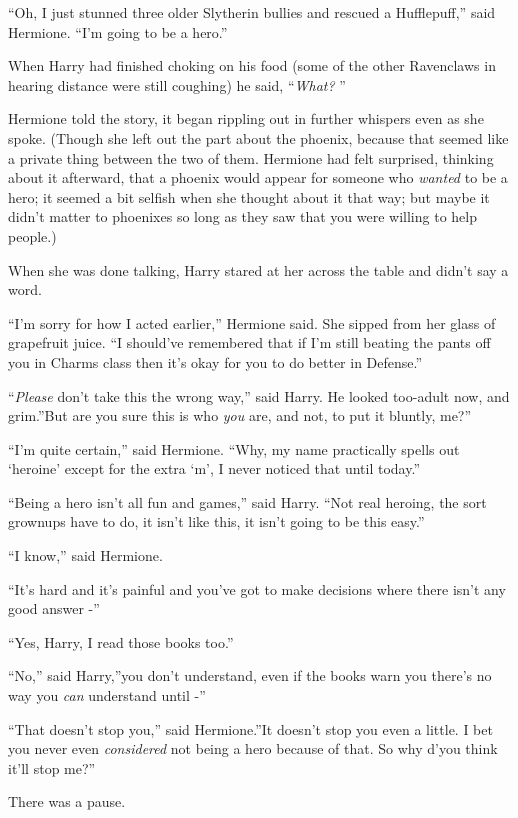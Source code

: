 ``Oh, I just stunned three older Slytherin bullies and rescued a
Hufflepuff,'' said Hermione. ``I'm going to be a hero.''

When Harry had finished choking on his food (some of the other
Ravenclaws in hearing distance were still coughing) he said,
``\emph{What?} ''

Hermione told the story, it began rippling out in further whispers even
as she spoke. (Though she left out the part about the phoenix, because
that seemed like a private thing between the two of them. Hermione had
felt surprised, thinking about it afterward, that a phoenix would appear
for someone who \emph{wanted} to be a hero; it seemed a bit selfish when
she thought about it that way; but maybe it didn't matter to phoenixes
so long as they saw that you were willing to help people.)

When she was done talking, Harry stared at her across the table and
didn't say a word.

``I'm sorry for how I acted earlier,'' Hermione said. She sipped from
her glass of grapefruit juice. ``I should've remembered that if I'm
still beating the pants off you in Charms class then it's okay for you
to do better in Defense.''

``\emph{Please} don't take this the wrong way,'' said Harry. He looked
too-adult now, and grim.''But are you sure this is who \emph{you} are,
and not, to put it bluntly, me?''

``I'm quite certain,'' said Hermione. ``Why, my name practically spells
out `heroine' except for the extra `m', I never noticed that until
today.''

``Being a hero isn't all fun and games,'' said Harry. ``Not real
heroing, the sort grownups have to do, it isn't like this, it isn't
going to be this easy.''

``I know,'' said Hermione.

``It's hard and it's painful and you've got to make decisions where
there isn't any good answer -''

``Yes, Harry, I read those books too.''

``No,'' said Harry,''you don't understand, even if the books warn you
there's no way you \emph{can} understand until -''

``That doesn't stop you,'' said Hermione.''It doesn't stop you even a
little. I bet you never even \emph{considered} not being a hero because
of that. So why d'you think it'll stop me?''

There was a pause.

